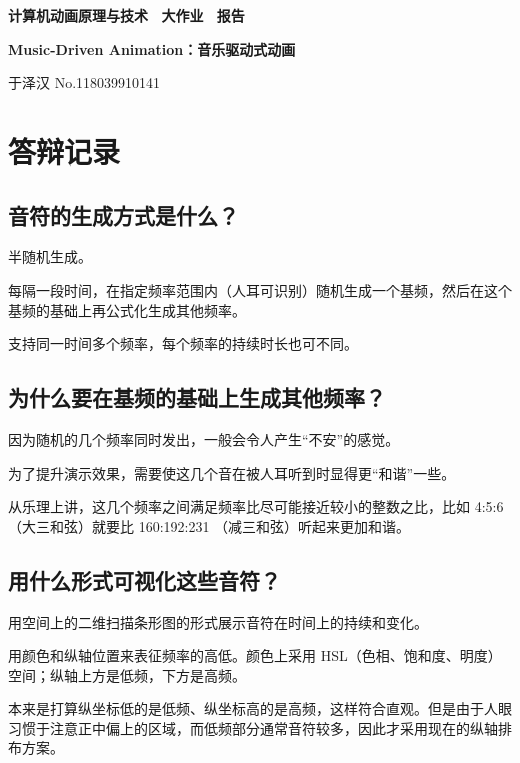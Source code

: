 \documentclass[a4paper, 12pt]{article}
\begin{document}
\begin{center}
{\bfseries {计算机动画原理与技术 ~大作业 ~报告}}

\vspace{0.5\baselineskip}

{\bfseries {Music-Driven Animation：音乐驱动式动画}}

\vspace{0.5\baselineskip}

{ \kaishu 于泽汉 \hspace{1em} \textsf{No.118039910141}}
\end{center}

\section{答辩记录}

\subsection{音符的生成方式是什么？}
半随机生成。

每隔一段时间，在指定频率范围内（人耳可识别）随机生成一个基频，然后在这个基频的基础上再公式化生成其他频率。

支持同一时间多个频率，每个频率的持续时长也可不同。


\subsection{为什么要在基频的基础上生成其他频率？}
因为随机的几个频率同时发出，一般会令人产生“不安”的感觉。

为了提升演示效果，需要使这几个音在被人耳听到时显得更“和谐”一些。

从乐理上讲，这几个频率之间满足频率比尽可能接近较小的整数之比，比如 4:5:6 （大三和弦）就要比 160:192:231 （减三和弦）听起来更加和谐。

\subsection{用什么形式可视化这些音符？}

用空间上的二维扫描条形图的形式展示音符在时间上的持续和变化。

用颜色和纵轴位置来表征频率的高低。颜色上采用 HSL（色相、饱和度、明度）空间；纵轴上方是低频，下方是高频。

本来是打算纵坐标低的是低频、纵坐标高的是高频，这样符合直观。但是由于人眼习惯于注意正中偏上的区域，而低频部分通常音符较多，因此才采用现在的纵轴排布方案。
\end{document}
